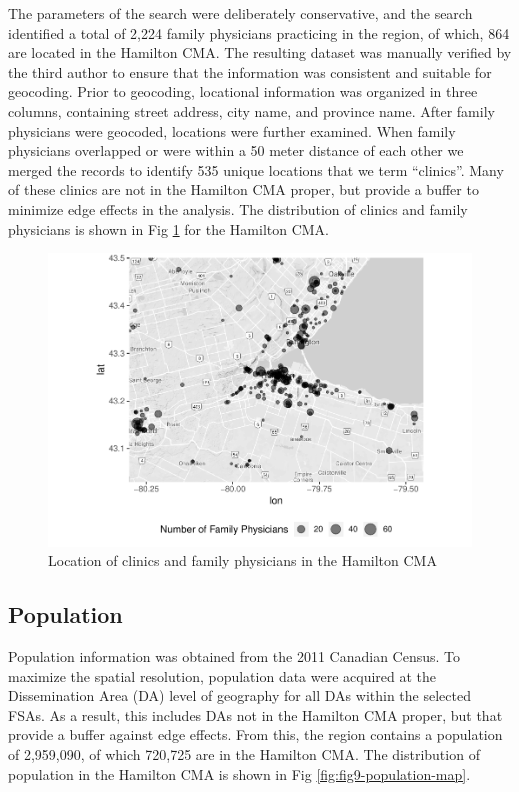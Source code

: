 \documentclass[10pt,letterpaper]{article}
\begin{document}
The parameters of the search were deliberately conservative, and the
search identified a total of 2,224 family physicians practicing in the
region, of which, 864 are located in the Hamilton CMA. The resulting
dataset was manually verified by the third author to ensure that the
information was consistent and suitable for geocoding. Prior to
geocoding, locational information was organized in three columns,
containing street address, city name, and province name. After family
physicians were geocoded, locations were further examined. When family
physicians overlapped or were within a 50 meter distance of each other
we merged the records to identify 535 unique locations that we term
``clinics''. Many of these clinics are not in the Hamilton CMA proper,
but provide a buffer to minimize edge effects in the analysis. The
distribution of clinics and family physicians is shown in Fig
\ref{fig:fig8-clinic-map} for the Hamilton CMA.

\begin{figure}
\includegraphics[width=0.95\linewidth]{Supply_and_Demand_Inflation_in_FCA_Methods_v2.0_files/figure-latex/fig8-clinic-map-1} \caption{\label{fig:fig8-clinic-map}Location of clinics and family physicians in the Hamilton CMA}\label{fig:fig8-clinic-map}
\end{figure}

\subsection{Population}\label{population}

Population information was obtained from the 2011 Canadian Census. To
maximize the spatial resolution, population data were acquired at the
Dissemination Area (DA) level of geography for all DAs within the
selected FSAs. As a result, this includes DAs not in the Hamilton CMA
proper, but that provide a buffer against edge effects. From this, the
region contains a population of 2,959,090, of which 720,725 are in the
Hamilton CMA. The distribution of population in the Hamilton CMA is
shown in Fig \ref{fig:fig9-population-map}.
\end{document}
